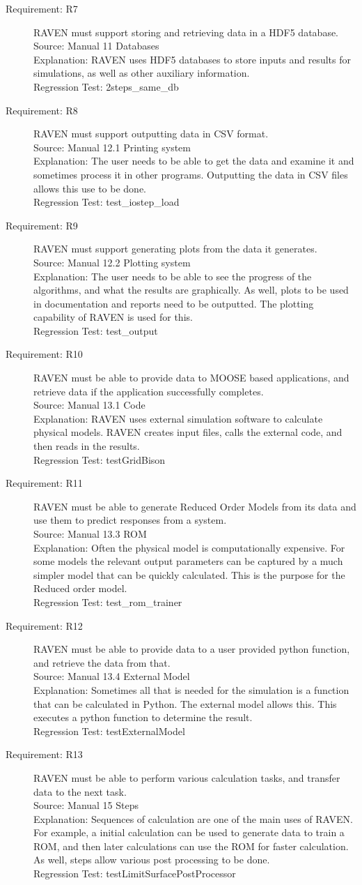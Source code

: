 \documentclass{article}
\newcommand{\requirement}[5]{\item[Requirement: #1] #2 \\Source: #3\\Explanation: #4\\Regression Test: #5}
\begin{document}
\begin{description}
\requirement{R7}{RAVEN must support storing and retrieving data in a HDF5 database.}
{Manual 11 Databases}
{RAVEN uses HDF5 databases to store inputs and results for simulations, as well as other auxiliary information.}
{2steps\_same\_db}

\requirement{R8}{RAVEN must support outputting data in CSV format.}
{Manual 12.1 Printing system}
{The user needs to be able to get the data and examine it and sometimes process it in other programs.  Outputting the data in CSV files allows this use to be done.}
{test\_iostep\_load}

\requirement{R9}{RAVEN must support generating plots from the data it generates.}
{Manual 12.2 Plotting system}
{The user needs to be able to see the progress of the algorithms, and what the results are graphically.  As well, plots to be used in documentation and reports need to be outputted.  The plotting capability of RAVEN is used for this.}
{test\_output}

\requirement{R10}{RAVEN must be able to provide data to MOOSE based applications, and retrieve data if the application successfully completes.}
{Manual 13.1 Code}
{RAVEN uses external simulation software to calculate physical models.  RAVEN creates input files, calls the external code, and then reads in the results.}
{testGridBison}

\requirement{R11}{RAVEN must be able to generate Reduced Order Models from its data and use them to predict responses from a system.}
{Manual 13.3 ROM}
{Often the physical model is computationally expensive.  For some models the relevant output parameters can be captured by a much simpler model that can be quickly calculated.  This is the purpose for the Reduced order model.}
{test\_rom\_trainer}

\requirement{R12}{RAVEN must be able to provide data to a user provided python function, and retrieve the data from that.}
{Manual 13.4 External Model}
{Sometimes all that is needed for the simulation is a function that can be calculated in Python.  The external model allows this.  This executes a python function to determine the result.}
{testExternalModel}

\requirement{R13}{RAVEN must be able to perform various calculation tasks, and transfer data to the next task.}
{Manual 15 Steps}
{Sequences of calculation are one of the main uses of RAVEN.  For example, a initial calculation can be used to generate data to train a ROM, and then later calculations can use the ROM for faster calculation.  As well, steps allow various post processing to be done.}
{testLimitSurfacePostProcessor}


\end{description}
\end{document}
